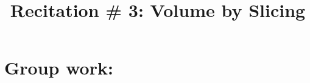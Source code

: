 \documentclass[noinstructornotes]{ximera}
\title{Recitation \# 3: Volume by Slicing}
\begin{document}
\begin{abstract}		\end{abstract}
\maketitle

\section{Group work:}
\end{document}
